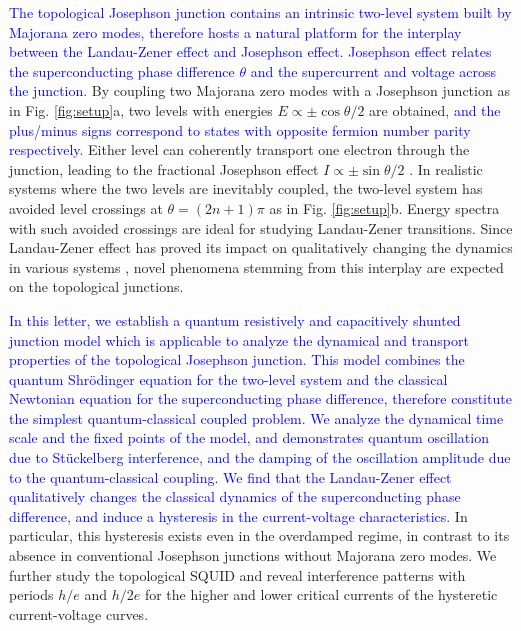 \documentclass[aps,prl,twocolumn,showpacs,showpacs,10pt,superscriptaddress]{revtex4-1}
\newcommand{\blue}[1]{\textcolor{blue}{#1}}
\begin{document}
\blue{The topological Josephson junction contains an intrinsic two-level system built by Majorana zero modes, therefore hosts a natural platform for the interplay between the Landau-Zener effect and Josephson effect. Josephson effect relates the superconducting phase difference $\theta$ and the supercurrent and voltage across the junction.  }
By coupling two Majorana zero modes with a Josephson junction as in Fig. \ref{fig:setup}a, two levels with energies $E\propto\pm\cos\theta/2$ are obtained, \blue{and the plus/minus signs correspond to states with opposite fermion number parity respectively.} Either level can coherently transport one electron through the junction, leading to the fractional Josephson effect $I \propto \pm \sin \theta/2$ \cite{fuprb09,Lutchyn10,oregprl10}. In realistic systems where the two levels are inevitably coupled, the two-level system has avoided level crossings at $\theta = (2n+1)\pi$ as in Fig. \ref{fig:setup}b. Energy spectra with such avoided crossings are ideal for studying Landau-Zener transitions. Since Landau-Zener effect has proved its impact on qualitatively changing the dynamics in various systems \cite{Chen11,Liu13,ludwig,higuchi,Law16,wubiao}, novel phenomena stemming from this interplay are expected on the topological junctions.



\blue{In this letter, we establish a quantum resistively and capacitively shunted junction model which is applicable to analyze the dynamical and transport properties of the topological Josephson junction. This model combines the quantum Shr\"{o}dinger equation for the two-level system and the classical Newtonian equation for the superconducting phase difference, therefore constitute the simplest quantum-classical coupled problem. We analyze the dynamical time scale and the fixed points of the model, and demonstrates quantum oscillation due to St\"{u}ckelberg interference, and the damping of the oscillation amplitude due to the quantum-classical coupling. We find that the Landau-Zener effect qualitatively changes the classical dynamics of the superconducting phase difference, and induce a hysteresis in the current-voltage characteristics.}
In particular, this hysteresis exists even in the overdamped regime, in contrast to its absence in conventional Josephson junctions without Majorana zero modes. We further study the topological SQUID and reveal interference patterns with periods $h/e$ and $h/2e$ for the higher and lower critical currents of the hysteretic current-voltage curves.
\end{document}
